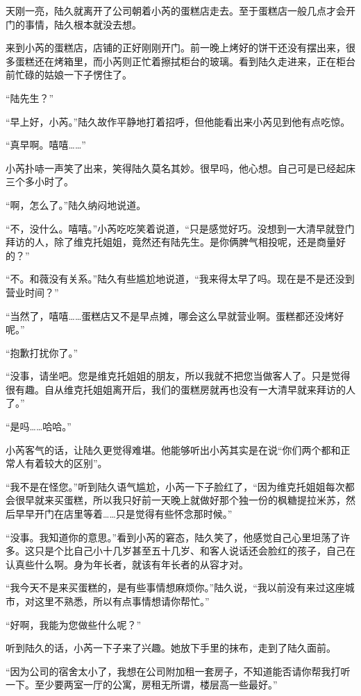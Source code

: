 天刚一亮，陆久就离开了公司朝着小芮的蛋糕店走去。至于蛋糕店一般几点才会开门的事情，陆久根本就没去想。



来到小芮的蛋糕店，店铺的正好刚刚开门。前一晚上烤好的饼干还没有摆出来，很多蛋糕还在烤箱里，而小芮则正忙着擦拭柜台的玻璃。看到陆久走进来，正在柜台前忙碌的姑娘一下子愣住了。

“陆先生？”

“早上好，小芮。”陆久故作平静地打着招呼，但他能看出来小芮见到他有点吃惊。

“真早啊。嘻嘻……”

小芮扑哧一声笑了出来，笑得陆久莫名其妙。很早吗，他心想。自己可是已经起床三个多小时了。

“啊，怎么了。”陆久纳闷地说道。

“不，没什么。嘻嘻。”小芮吃吃笑着说道，“只是感觉好巧。没想到一大清早就登门拜访的人，除了维克托姐姐，竟然还有陆先生。是你俩脾气相投呢，还是商量好的？”

“不。和薇没有关系。”陆久有些尴尬地说道，“我来得太早了吗。现在是不是还没到营业时间？”

“当然了，嘻嘻……蛋糕店又不是早点摊，哪会这么早就营业啊。蛋糕都还没烤好呢。”

“抱歉打扰你了。”

“没事，请坐吧。您是维克托姐姐的朋友，所以我就不把您当做客人了。只是觉得很有趣。自从维克托姐姐离开后，我们的蛋糕房就再也没有一大清早就来拜访的人了。”

“是吗……哈哈。”

小芮客气的话，让陆久更觉得难堪。他能够听出小芮其实是在说“你们两个都和正常人有着较大的区别”。

“我不是在怪您。”听到陆久语气尴尬，小芮一下子脸红了，“因为维克托姐姐每次都会很早就来买蛋糕，所以我只好前一天晚上就做好那个独一份的枫糖提拉米苏，然后早早开门在店里等着……只是觉得有些怀念那时候。”

“没事。我知道你的意思。”看到小芮的窘态，陆久笑了，他感觉自己心里坦荡了许多。这只是个比自己小十几岁甚至五十几岁、和客人说话还会脸红的孩子，自己在认真些什么啊。身为年长者，就该有年长者的从容才对。

“我今天不是来买蛋糕的，是有些事情想麻烦你。”陆久说，“我以前没有来过这座城市，对这里不熟悉，所以有点事情想请你帮忙。”

“好啊，我能为您做些什么呢？”

听到陆久的话，小芮一下子来了兴趣。她放下手里的抹布，走到了陆久面前。

“因为公司的宿舍太小了，我想在公司附加租一套房子，不知道能否请你帮我打听一下。至少要两室一厅的公寓，房租无所谓，楼层高一些最好。”

